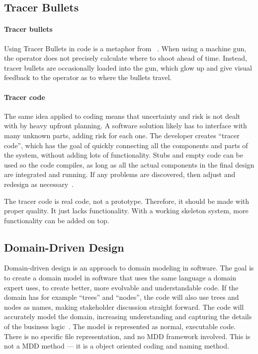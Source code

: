\subsection{Tracer Bullets}

\paragraph{Tracer bullets}
Using Tracer Bullets in code is a metaphor from ~\cite{huntPragmaticProgrammerJourneyman2000}.
When using a machine gun, the operator does not precisely calculate where to shoot ahead of time.
Instead, tracer bullets are occasionally loaded into the gun, which glow up and give visual feedback to the operator as to where the bullets travel.


\paragraph{Tracer code}
The same idea applied to coding means that uncertainty and risk is not dealt with by heavy upfront planning.
A software solution likely has to interface with many unknown parts, adding risk for each one.
The developer creates ``tracer code'', which has the goal of quickly connecting all the components and parts of the system, without adding lots of functionality.
Stubs and empty code can be used so the code compiles, as long as all the actual components in the final design are integrated and running.
If any problems are discovered, then adjust and redesign as necessary~\cite{huntPragmaticProgrammerJourneyman2000}. 


The tracer code is real code, not a prototype.
Therefore, it should be made with proper quality.
It just lacks functionality.
With a working skeleton system, more functionality can be added on top.


\subsection{Domain-Driven Design}

Domain-driven design is an approach to domain modeling in software.
The goal is to create a domain model in software that uses the same language a domain expert uses, to create better, more evolvable and understandable code.
If the domain has for example ``trees'' and ``nodes'', the code will also use trees and nodes as names, making stakeholder discussion straight forward.
The code will accurately model the domain, increasing understanding and capturing the details of the business logic~\cite{evansDomaindrivenDesignTackling2004}.
The model is represented as normal, executable code.
There is no specific file representation, and no \acrshort{MDD} framework involved.
This is not a \acrshort{MDD} method --- it is a object oriented coding and naming method.


